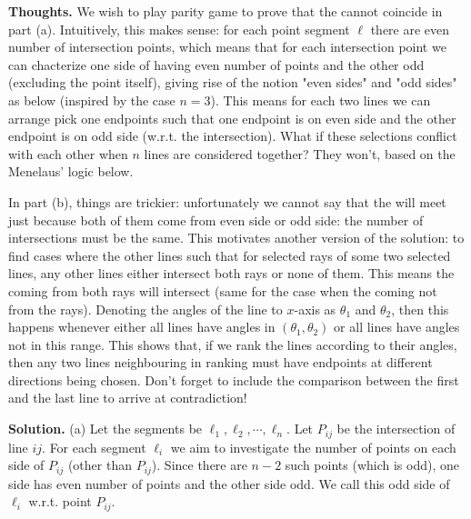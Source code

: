 \documentclass[11pt,a4paper]{article}
\begin{document}
\begin{itemize}
\textbf{Thoughts.} 
We wish to play parity game to prove that the \animals cannot coincide in part (a). 
Intuitively, this makes sense: 
for each point segment $\ell$ there are even number of intersection points, 
which means that for each intersection point we can chacterize one side of having even number of points and the other odd 
(excluding the point itself), giving rise of the notion "even sides" and "odd sides" as below (inspired by the case $n=3$). 
This means for each two lines we can arrange pick one endpoints such that one endpoint is on even side and the other endpoint is on odd side (w.r.t. the intersection). 
What if these selections conflict with each other when $n$ lines are considered together? 
They won't, based on the Menelaus' logic below. 

In part (b), things are trickier: unfortunately we cannot say that the \animals will meet just because both of them come from even side or odd side: the number of intersections must be the same. 
This motivates another version of the solution: 
to find cases where the other lines such that for selected rays of some two selected lines, any other lines either intersect both rays or none of them. 
This means the \animals coming from both rays will intersect (same for the case when the \animals coming not from the rays). 
Denoting the angles of the line to $x$-axis as $\theta_1$ and $\theta_2$, then this happens whenever either all lines have angles in $(\theta_1, \theta_2)$ or all lines have angles not in this range. 
This shows that, if we rank the lines according to their angles, then any two lines neighbouring in ranking must have endpoints at different directions being chosen. 
Don't forget to include the comparison between the first and the last line to arrive at contradiction!

\textbf{Solution.} (a) Let the segments be $\ell_1, \ell_2, \cdots , \ell_n$. 
Let $P_{ij}$ be the intersection of line $ij$. For each segment $\ell_i$ we aim to investigate the number of points on each side of $P_{ij}$ (other than $P_{ij}$). 
Since there are $n-2$ such points (which is odd), 
one side has even number of points and the other side odd. 
We call this odd side of $\ell_i$ w.r.t. point $P_{ij}$. 


\end{itemize}
\end{document}
